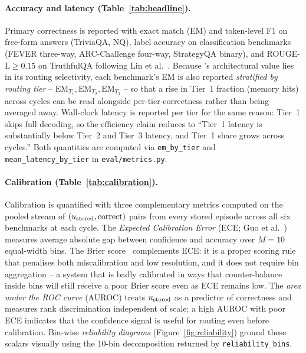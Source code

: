 \paragraph{Accuracy and latency (Table~\ref{tab:headline}).}
Primary correctness is reported with exact match (EM) and token-level
F1 on free-form answers (TriviaQA, NQ), label accuracy on classification
benchmarks (FEVER three-way, ARC-Challenge four-way,
StrategyQA binary), and ROUGE-L$\geq 0.15$ on TruthfulQA following
Lin et al.~\cite{lin-etal-2022-truthfulqa}.
Because \caem{}'s architectural value lies in its routing selectivity,
each benchmark's EM is also reported
\emph{stratified by routing tier} -- $\mathrm{EM}_{T_1},
\mathrm{EM}_{T_2}, \mathrm{EM}_{T_3}$ -- so that a rise in Tier~1
fraction (memory hits) across cycles can be read alongside per-tier
correctness rather than being averaged away.
Wall-clock latency is reported per tier for the same reason: Tier~1
skips full decoding, so the efficiency claim reduces to ``Tier~1
latency is substantially below Tier~2 and Tier~3 latency, and Tier~1
share grows across cycles.'' Both quantities are computed via
\texttt{em\_by\_tier} and \texttt{mean\_latency\_by\_tier} in
\texttt{eval/metrics.py}.

\paragraph{Calibration (Table~\ref{tab:calibration}).}
Calibration is quantified with three complementary metrics computed on
the pooled stream of $(u_{\text{stored}}, \mathrm{correct})$ pairs from every
stored episode across all six benchmarks at each cycle.
The \emph{Expected Calibration Error} (ECE; Guo et
al.~\cite{pmlr-v70-guo17a}) measures average absolute gap between
confidence and accuracy over $M=10$ equal-width bins.
The Brier score~\cite{brier1950verification}
complements ECE: it is a proper scoring rule that penalises both
miscalibration and low resolution, and it does not require bin
aggregation -- a system that is badly calibrated in ways that
counter-balance inside bins will still receive a poor Brier score
even as ECE remains low.
The \emph{area under the ROC curve} (AUROC) treats $u_{\text{stored}}$ as a
predictor of correctness and measures rank discrimination independent
of scale; a high AUROC with poor ECE indicates that the confidence
signal is useful for routing even before calibration.
Bin-wise \emph{reliability diagrams} (Figure~\ref{fig:reliability})
ground these scalars visually using the 10-bin decomposition returned
by \texttt{reliability\_bins}.

